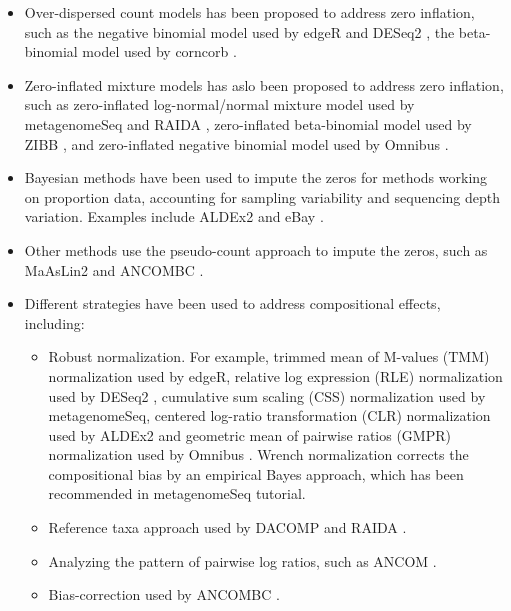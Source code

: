 \documentclass[
]{book}
\begin{document}
\begin{itemize}
\item
  Over-dispersed count models has been proposed to address zero
  inflation, such as the negative binomial model used by edgeR
  \citep{Chen2016} and DESeq2 \citep{Love2014}, the beta-binomial model used by
  corncorb \citep{Martin2021}.
\item
  Zero-inflated mixture models has aslo been proposed to address zero
  inflation, such as zero-inflated log-normal/normal mixture model
  used by metagenomeSeq \citep{Paulson2017} and RAIDA \citep{Sohn2015},
  zero-inflated beta-binomial model used by ZIBB \citep{ZIBB2018}, and
  zero-inflated negative binomial model used by Omnibus
  \citep{Omnibus2018}.
\item
  Bayesian methods have been used to impute the zeros for methods
  working on proportion data, accounting for sampling variability and
  sequencing depth variation. Examples include ALDEx2 \citep{Gloor2016} and
  eBay \citep{Liu2020}.
\item
  Other methods use the pseudo-count approach to impute the zeros,
  such as MaAsLin2 \citep{Mallick2020} and ANCOMBC \citep{ancombc2020}.
\item
  Different strategies have been used to address compositional
  effects, including:

  \begin{itemize}
  \item
    Robust normalization. For example, trimmed mean of M-values (TMM)
    normalization used by edgeR, relative log expression (RLE)
    normalization used by DESeq2 \citep{Love2014}, cumulative sum scaling
    (CSS) normalization used by metagenomeSeq, centered log-ratio
    transformation (CLR) normalization used by ALDEx2 \citep{Gloor2016} and
    geometric mean of pairwise ratios (GMPR) normalization used by
    Omnibus \citep{Omnibus2018}. Wrench normalization \citep{Kumar2018} corrects
    the compositional bias by an empirical Bayes approach, which has
    been recommended in metagenomeSeq \citep{Paulson2017} tutorial.
  \item
    Reference taxa approach used by DACOMP \citep{Brill2019} and RAIDA \citep{Sohn2015}.
  \item
    Analyzing the pattern of pairwise log ratios, such as ANCOM \citep{Mandal2015}.
  \item
    Bias-correction used by ANCOMBC \citep{ancombc2020}.
  \end{itemize}
\end{itemize}
\end{document}
